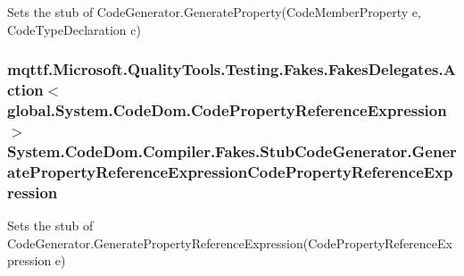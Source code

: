 Sets the stub of Code\-Generator.\-Generate\-Property(\-Code\-Member\-Property e, Code\-Type\-Declaration c)

\hypertarget{class_system_1_1_code_dom_1_1_compiler_1_1_fakes_1_1_stub_code_generator_a362210bb8034da7bf13ebbad52561311}{
\subsubsection[{Generate\-Property\-Reference\-Expression\-Code\-Property\-Reference\-Expression}]{\setlength{\rightskip}{0pt plus 5cm}mqttf.\-Microsoft.\-Quality\-Tools.\-Testing.\-Fakes.\-Fakes\-Delegates.\-Action$<$global.\-System.\-Code\-Dom.\-Code\-Property\-Reference\-Expression$>$ System.\-Code\-Dom.\-Compiler.\-Fakes.\-Stub\-Code\-Generator.\-Generate\-Property\-Reference\-Expression\-Code\-Property\-Reference\-Expression}}\label{class_system_1_1_code_dom_1_1_compiler_1_1_fakes_1_1_stub_code_generator_a362210bb8034da7bf13ebbad52561311}


Sets the stub of Code\-Generator.\-Generate\-Property\-Reference\-Expression(\-Code\-Property\-Reference\-Expression e)

